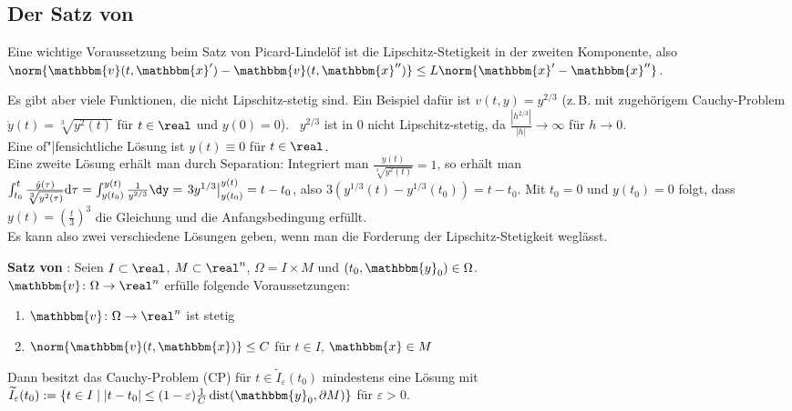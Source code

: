 \pagebreak

\subsection{%
    Der Satz von %
}

Eine wichtige Voraussetzung beim Satz von Picard-Lindelöf ist die
Lipschitz-Stetigkeit in der zweiten Komponente, also
$\norm{\mathbbm{v}(t, \mathbbm{x}') - \mathbbm{v}(t, \mathbbm{x}'')} \le
L\norm{\mathbbm{x}' - \mathbbm{x}''}$.

Es gibt aber viele Funktionen, die nicht Lipschitz-stetig sind.
Ein Beispiel dafür ist $v(t, y) = y^{2/3}$
(z.\,B. mit zugehörigem Cauchy-Problem
$\dot{y}(t) = \sqrt[3]{y^2(t)}$ für $t \in \real$ und $y(0) = 0$). \
$y^{2/3}$ ist in $0$ nicht Lipschitz-stetig, da
$\frac{|h^{2/3}|}{|h|} \to \infty$ für $h \to 0$. \\
Eine of"|fensichtliche Lösung ist $y(t) \equiv 0$ für $t \in \real$. \\
Eine zweite Lösung erhält man durch Separation:
Integriert man $\frac{\dot{y}(t)}{\sqrt[3]{y^2(t)}} = 1$, so erhält man
$\int_{t_0}^t \frac{\dot{y}(\tau)}{\sqrt[3]{y^2(\tau)}} \d\tau =
\int_{y(t_0)}^{y(t)} \frac{1}{y^{2/3}} \dy =
\left.3y^{1/3}\right|_{y(t_0)}^{y(t)} = t - t_0$,
also $3(y^{1/3}(t) - y^{1/3}(t_0)) = t - t_0$.
Mit $t_0 = 0$ und $y(t_0) = 0$ folgt, dass
$y(t) = \left(\frac{t}{3}\right)^3$ die Gleichung und die Anfangsbedingung
erfüllt. \\
Es kann also zwei verschiedene Lösungen geben, wenn man die Forderung der
Lipschitz-Stetig\-keit weglässt.

\linie

\textbf{Satz von }:
Seien $I \subset \real$, $M \subset \real^n$, $\Omega = I \times M$
und $(t_0, \mathbbm{y}_0) \in \Omega$. \\
$\mathbbm{v}\colon \Omega \rightarrow \real^n$ erfülle folgende
Voraussetzungen:
\begin{enumerate}
    \item
    $\mathbbm{v}\colon \Omega \rightarrow \real^n$ ist stetig
    
    \item
    $\norm{\mathbbm{v}(t, \mathbbm{x})} \le C$ für
    $t \in I$, $\mathbbm{x} \in M$
\end{enumerate}
Dann besitzt das Cauchy-Problem (CP) für $t \in \widetilde{I}_\varepsilon(t_0)$
mindestens eine Lösung mit \\
$\widetilde{I}_\varepsilon(t_0) := \{t \in I \;|\; |t - t_0| \le
(1 - \varepsilon) \frac{1}{C} \dist(\mathbbm{y}_0, \partial M)\}$
für $\varepsilon > 0$.

